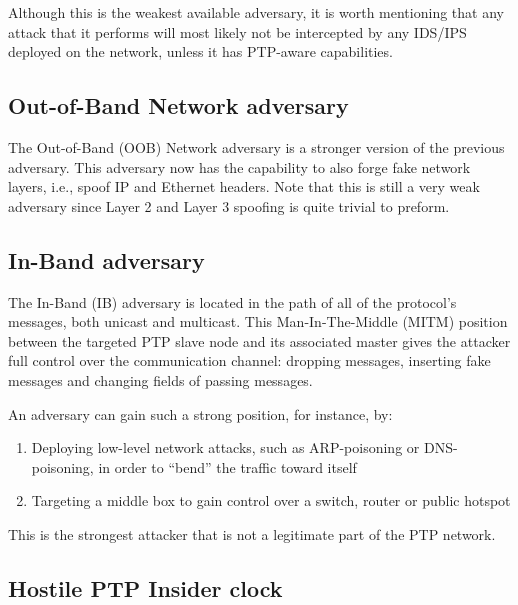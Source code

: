 \documentclass[11pt]{article}
\begin{document}
Although this is the weakest available adversary, it is worth mentioning that any attack that it performs will most likely not be intercepted by any IDS/IPS deployed on the network, unless it has PTP-aware capabilities.



\subsection{Out-of-Band Network adversary}\label{adv:OOB-net}

The Out-of-Band (OOB) Network adversary is a stronger version of the previous adversary. This adversary now has the capability to also forge fake network layers, i.e., spoof IP and Ethernet headers. Note that this is still a very weak adversary since Layer 2 and Layer 3 spoofing is quite trivial to preform.



\subsection{In-Band adversary}\label{adv:IB}

The In-Band (IB) adversary is located in the path of all of the protocol's messages, both unicast and multicast. This Man-In-The-Middle (MITM) position between the targeted PTP slave node and its associated master gives the attacker full control over the communication channel: dropping messages, inserting fake messages and changing fields of passing messages.

An adversary can gain such a strong position, for instance, by:

\begin{enumerate}

  \item Deploying low-level network attacks, such as ARP-poisoning or DNS-poisoning, in order to ``bend'' the traffic toward itself

  \item Targeting a middle box to gain control over a switch, router or public hotspot

\end{enumerate}

This is the strongest attacker that is not a legitimate part of the PTP network.



\subsection{Hostile PTP Insider clock}\label{adv:slave}
\end{document}
